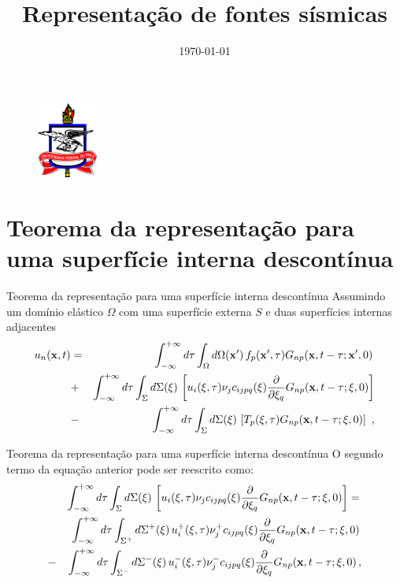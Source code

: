 \documentclass{beamer}
\title[Seminário]{Representa\c{c}\~ao de fontes s\'ismicas} %
\author{} %
\institute[UFPA] %
{
	Professor: Jessé Costa\\
Universidade Federal do Pará \\ %
\medskip
}
\date{\today} %
\newcommand{\xvec}{\mathbf{x}}
\newcommand{\xivec}{\boldmath \xi}
\begin{document}
 \begin{frame}
\begin{figure}[htb]
\centering
\includegraphics[width= 2cm, height= 2.5cm]{logo.jpg}
\end{figure}

\titlepage
\end{frame}

\section{Teorema da representa\c{c}\~ao para uma superf\'icie interna descont\'inua}

\begin{frame}{Teorema da representa\c{c}\~ao para uma superf\'icie interna descont\'inua}
Assumindo um dom\'inio el\'astico $\Omega$ com uma superf\'icie externa $S$ e duas superf\'icies internas 
adjacentes
\begin{eqnarray}
\label{trep1}
u_{n}(\xvec,t) &=&  \int_{-\infty
}^{+\infty}d\tau\int_{\Omega}d\Omega(\xvec')\,
f_{p}(\xvec',\tau) G_{np}(\xvec,t-\tau;\xvec',0)\nonumber \, \\
&+& \int_{-\infty }^{+\infty}d\tau\int_{\Sigma}d\Sigma(\xivec) 
\, \left[ u_{i}(\xivec,\tau) \nu_{j}c_{ijpq}(\xivec) \frac{\partial}{\partial \xi_q} G_{np}(\xvec,t-\tau;\xivec,0)\right] 
\nonumber \\      
&-&  \int_{-\infty }^{+\infty}d\tau\int_{\Sigma}d\Sigma(\xivec)
\, \left[ T_{p}(\xivec,\tau) G_{np}(\xvec,t-\tau;\xivec,0)\right] \ \nonumber ,
\end{eqnarray}
	
\end{frame}

\begin{frame}{Teorema da representa\c{c}\~ao para uma superf\'icie interna descont\'inua}
	O segundo termo da equação anterior pode ser reescrito como:
	\begin{eqnarray*}  
		& & \int_{-\infty }^{+\infty}d\tau\int_{\Sigma}d\Sigma(\xivec)\, \left[ u_{i}(\xivec,\tau) \nu_{j}c_{ijpq}(\xivec) \frac{\partial}{\partial \xi_q} G_{np}(\xvec,t-\tau;\xivec,0)\right] =  \, \\
		& & \int_{-\infty }^{+\infty}d\tau\int_{\Sigma^{+}}d\Sigma^{+}(\xivec)\, u^{+}_{i}(\xivec,\tau) \nu^{+}_{j} c_{ijpq}(\xivec) \frac{\partial}{\partial \xi_q} G_{np}(\xvec,t-\tau;\xivec,0)\, \\
		& - & \int_{-\infty }^{+\infty}d\tau\int_{\Sigma^{-}}d\Sigma^{-}(\xivec)\, u^{-}_{i}(\xivec,\tau) \nu^{-}_{j} c_{ijpq}(\xivec) \frac{\partial}{\partial \xi_q} G_{np}(\xvec,t-\tau;\xivec,0)\, , \nonumber  
	\end{eqnarray*}
\end{frame}
\end{document}
